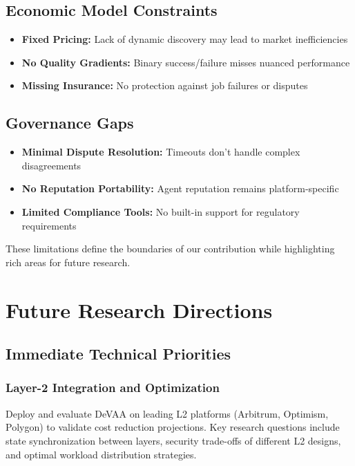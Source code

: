 \subsection{Economic Model Constraints}
\begin{itemize}
    \item \textbf{Fixed Pricing:} Lack of dynamic discovery may lead to market inefficiencies
    \item \textbf{No Quality Gradients:} Binary success/failure misses nuanced performance
    \item \textbf{Missing Insurance:} No protection against job failures or disputes
\end{itemize}

\subsection{Governance Gaps}
\begin{itemize}
    \item \textbf{Minimal Dispute Resolution:} Timeouts don't handle complex disagreements
    \item \textbf{No Reputation Portability:} Agent reputation remains platform-specific
    \item \textbf{Limited Compliance Tools:} No built-in support for regulatory requirements
\end{itemize}

These limitations define the boundaries of our contribution while highlighting rich areas for future research.

\section{Future Research Directions}

\subsection{Immediate Technical Priorities}

\subsubsection{Layer-2 Integration and Optimization}
Deploy and evaluate DeVAA on leading L2 platforms (Arbitrum, Optimism, Polygon) to validate cost reduction projections. Key research questions include state synchronization between layers, security trade-offs of different L2 designs, and optimal workload distribution strategies.

